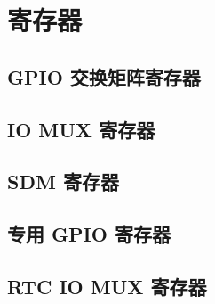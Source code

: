 \documentclass[main\_\_CN.tex]{subfiles}
\begin{document}
\section{寄存器}


\subsection{GPIO 交换矩阵寄存器}


\subsection{IO MUX 寄存器}


\subsection{SDM 寄存器}


\subsection{专用 GPIO 寄存器}


\subsection{RTC IO MUX 寄存器}

\end{document}
